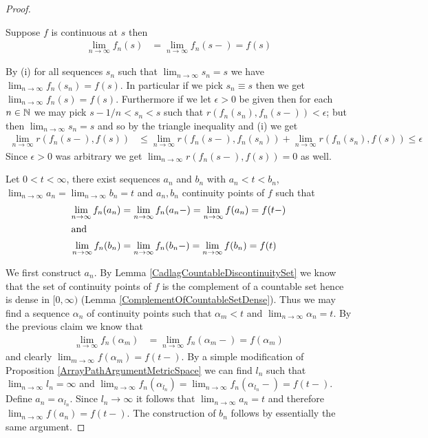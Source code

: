 \begin{proof}
\begin{clm}\label{SkorohodInfiniteJ1EquivalenceC:ClaimContinuityPoint}Suppose $f$ is continuous at $s$ then 
\begin{align*}
\lim_{n \to \infty} f_n(s) &= \lim_{n \to \infty} f_n(s-) = f(s)
\end{align*}
\end{clm}
By (i) for all sequences $s_n$ such that $\lim_{n \to \infty} s_n = s$ we have $\lim_{n \to \infty} f_n(s_n) = f(s)$.   In particular if we pick $s_n \equiv s$ then we get $\lim_{n \to \infty} f_n(s) = f(s)$.  Furthermore if we let $\epsilon > 0$ be given then for each $n \in \mathbb{N}$ we may pick $s - 1/n < s_n < s$ such that $r(f_n(s_n), f_n(s-)) < \epsilon$; but then $\lim_{n \to \infty} s_n = s$ and so by the triangle inequality and (i) we get
\begin{align*}
\lim_{n \to \infty} r(f_n(s-), f(s)) &\leq \lim_{n \to \infty} r(f_n(s-), f_n(s_n)) + \lim_{n \to \infty} r(f_n(s_n), f(s)) \leq \epsilon
\end{align*}
Since $\epsilon >0$ was arbitrary we get $\lim_{n \to \infty} r(f_n(s-), f(s)) =0$ as well.

\begin{clm}\label{SkorohodInfiniteJ1EquivalenceC:ClaimAnBn}Let $0 < t < \infty$, there exist sequences $a_n$ and $b_n$ with $a_n < t < b_n$, $\lim_{n \to \infty} a_n = \lim_{n \to \infty} b_n =t$ and $a_n, b_n$ continuity points of $f$ such that 
\begin{align*}
\lim_{n \to \infty} f_n(a_n) &= \lim_{n \to \infty} f_n(a_n-) = \lim_{n \to \infty} f(a_n) = f(t-) \\
\intertext{and}
\lim_{n \to \infty} f_n(b_n) &= \lim_{n \to \infty} f_n(b_n-) = \lim_{n \to \infty} f(b_n) = f(t) \\
\end{align*}
\end{clm}
We first construct $a_n$.  By Lemma \ref{CadlagCountableDiscontinuitySet} we know that the set of continuity points of $f$ is the complement of a countable set hence is dense in $[0,\infty)$ (Lemma \ref{ComplementOfCountableSetDense}).  Thus we may find a sequence $\alpha_n$ of continuity points such that $\alpha_m < t$ and $\lim_{n \to \infty} \alpha_n = t$.  By the previous claim we know that 
\begin{align*}
\lim_{n \to \infty} f_n(\alpha_m) &= \lim_{n \to \infty} f_n(\alpha_m-) = f(\alpha_m)
\end{align*}
and clearly $\lim_{m \to \infty} f(\alpha_m) = f(t-)$.  By a simple modification of Proposition \ref{ArrayPathArgumentMetricSpace} we can find $l_n$ such that $\lim_{n \to \infty} l_n = \infty$ and $\lim_{n \to \infty} f_n(\alpha_{l_n}) = \lim_{n \to \infty} f_n(\alpha_{l_n}-)  = f(t-)$.  Define $a_n = \alpha_{l_n}$.  Since $l_n \to \infty$ it follows that $\lim_{n \to \infty} a_n = t$ and therefore $\lim_{n \to \infty} f(a_n) = f(t-)$.  The construction of $b_n$ follows by essentially the same argument.


\end{proof}

